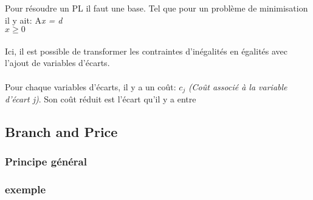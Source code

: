 
Pour résoudre un PL il faut une base. Tel que pour un problème de minimisation il y ait:
\newline
\newline
\hspace{2.5cm} A\textit{x = d} 
\\
\hspace{2.5cm}\textit{ $x \geq 0$}
\\
\\
Ici, il est possible de transformer les contraintes d'inégalités en égalités avec l'ajout de variables d'écarts. \\ \\ 
Pour chaque variables d'écarts, il y a un coût: \textit{$c_j$} \textit{(Coût associé à la variable d'écart j)}. 
Son coût réduit est l'écart qu'il y a entre 

\subsection{Branch and Price}
\subsubsection{Principe général}

\subsubsection{exemple}